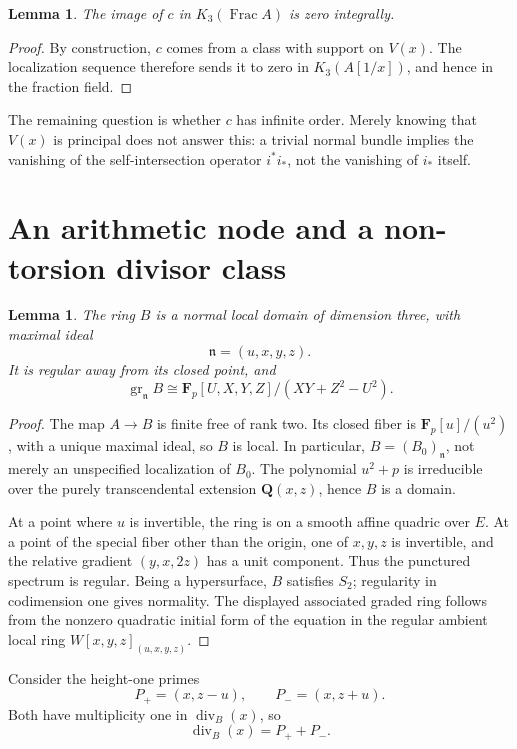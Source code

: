 \documentclass[11pt,a4paper]{article}
\newtheorem{lemma}[theorem]{Lemma}
\theoremstyle{remark}
\newcommand{\Q}{\mathbf Q}
\newcommand{\F}{\mathbf F}
\newcommand{\n}{\mathfrak n}
\newcommand{\Frac}{\operatorname{Frac}}
\newcommand{\divisor}{\operatorname{div}}
\begin{document}
\begin{lemma}\label{lem:genericzero}
The image of $c$ in $K_3(\Frac A)$ is zero integrally.
\end{lemma}
\begin{proof}
By construction, $c$ comes from a class with support on $V(x)$. The localization sequence therefore sends it to zero in $K_3(A[1/x])$, and hence in the fraction field.
\end{proof}

The remaining question is whether $c$ has infinite order. Merely knowing that $V(x)$ is principal does not answer this: a trivial normal bundle implies the vanishing of the self-intersection operator $i^*i_*$, not the vanishing of $i_*$ itself.

\section{An arithmetic node and a non-torsion divisor class}

\begin{lemma}\label{lem:normalB}
The ring $B$ is a normal local domain of dimension three, with maximal ideal
\[
\n=(u,x,y,z).
\]
It is regular away from its closed point, and
\[
\operatorname{gr}_{\n}B
\cong\F_p[U,X,Y,Z]/(XY+Z^2-U^2).
\]
\end{lemma}
\begin{proof}
The map $A\to B$ is finite free of rank two. Its closed fiber is $\F_p[u]/(u^2)$, with a unique maximal ideal, so $B$ is local. In particular, $B=(B_0)_{\n}$, not merely an unspecified localization of $B_0$. The polynomial $u^2+p$ is irreducible over the purely transcendental extension $\Q(x,z)$, hence $B$ is a domain.

At a point where $u$ is invertible, the ring is on a smooth affine quadric over $E$. At a point of the special fiber other than the origin, one of $x,y,z$ is invertible, and the relative gradient $(y,x,2z)$ has a unit component. Thus the punctured spectrum is regular. Being a hypersurface, $B$ satisfies $S_2$; regularity in codimension one gives normality. The displayed associated graded ring follows from the nonzero quadratic initial form of the equation in the regular ambient local ring $W[x,y,z]_{(u,x,y,z)}$.
\end{proof}

Consider the height-one primes
\[
P_+=(x,z-u),\qquad P_-=(x,z+u).
\]
Both have multiplicity one in $\divisor_B(x)$, so
\begin{equation}\label{eq:divx}
\divisor_B(x)=P_++P_-.
\end{equation}
\end{document}
